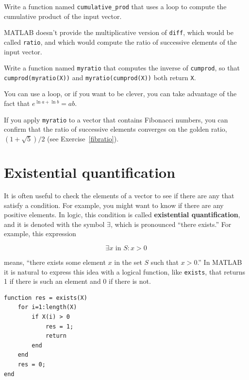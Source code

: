 \documentclass{book}
\begin{document}
\begin{ex}
Write a function named {\tt cumulative\_prod} that uses
a loop to compute the cumulative product of the input vector.
\end{ex}

MATLAB doesn't provide the multiplicative version
of {\tt diff}, which would be called {\tt ratio}, and which would
compute the ratio of successive elements of the input vector.

\begin{ex}
Write a function named {\tt myratio} that computes the
inverse of {\tt cumprod}, so that {\tt cumprod(myratio(X))} and
{\tt myratio(cumprod(X))} both
return {\tt X}.

You can use a loop, or if you want to be clever, you can take
advantage of the fact that $e^{\ln a + \ln b} = a b$.

If you apply {\tt myratio} to a vector that contains Fibonacci
numbers, you can confirm that the ratio of successive elements
converges on the golden ratio, $(1+\sqrt{5})/2$ (see
Exercise~\ref{fibratio}).
\end{ex}



\section{Existential quantification}

It is often useful to check the elements of a vector to see if there
are any that satisfy a condition.  For example, you might want to
know if there are any positive elements.  In logic, this condition
is called {\bf existential quantification}, and it is denoted with
the symbol $\exists$, which is pronounced ``there exists.''  For example,
this expression

\begin{equation}
\exists x \mbox{~in~} S: x>0
\end{equation}

means, ``there exists some element $x$ in the set $S$ such that
$x>0$.''  In MATLAB it is natural to express this idea with a logical
function, like {\tt exists}, that returns 1 if there is such an
element and 0 if there is not.

\begin{verbatim}
function res = exists(X)
    for i=1:length(X)
        if X(i) > 0
            res = 1;
            return
        end
    end
    res = 0;
end
\end{verbatim}
\end{document}
